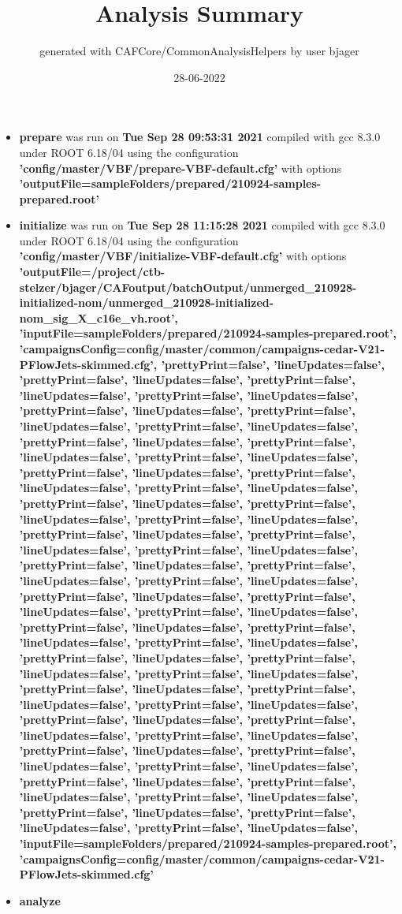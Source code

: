 \documentclass{article}
\title{Analysis Summary}
\author{generated with CAFCore/CommonAnalysisHelpers by user bjager}
\date{28-06-2022}
\begin{document}
\maketitle
\tableofcontents

\begin{itemize}
\item \textbf{prepare} was run on \textbf{Tue Sep 28 09:53:31 2021} compiled with gcc 8.3.0 under ROOT 6.18/04 using the configuration \textbf{'config/master/VBF/prepare-VBF-default.cfg'} with options \textbf{'outputFile=sampleFolders/prepared/210924-samples-prepared.root'} \item \textbf{initialize} was run on \textbf{Tue Sep 28 11:15:28 2021} compiled with gcc 8.3.0 under ROOT 6.18/04 using the configuration \textbf{'config/master/VBF/initialize-VBF-default.cfg'} with options \textbf{'outputFile=/project/ctb-stelzer/bjager/CAFoutput/batchOutput/unmerged\_210928-initialized-nom/unmerged\_210928-initialized-nom\_sig\_X\_c16e\_vh.root', 'inputFile=sampleFolders/prepared/210924-samples-prepared.root', 'campaignsConfig=config/master/common/campaigns-cedar-V21-PFlowJets-skimmed.cfg', 'prettyPrint=false', 'lineUpdates=false', 'prettyPrint=false', 'lineUpdates=false', 'prettyPrint=false', 'lineUpdates=false', 'prettyPrint=false', 'lineUpdates=false', 'prettyPrint=false', 'lineUpdates=false', 'prettyPrint=false', 'lineUpdates=false', 'prettyPrint=false', 'lineUpdates=false', 'prettyPrint=false', 'lineUpdates=false', 'prettyPrint=false', 'lineUpdates=false', 'prettyPrint=false', 'lineUpdates=false', 'prettyPrint=false', 'lineUpdates=false', 'prettyPrint=false', 'lineUpdates=false', 'prettyPrint=false', 'lineUpdates=false', 'prettyPrint=false', 'lineUpdates=false', 'prettyPrint=false', 'lineUpdates=false', 'prettyPrint=false', 'lineUpdates=false', 'prettyPrint=false', 'lineUpdates=false', 'prettyPrint=false', 'lineUpdates=false', 'prettyPrint=false', 'lineUpdates=false', 'prettyPrint=false', 'lineUpdates=false', 'prettyPrint=false', 'lineUpdates=false', 'prettyPrint=false', 'lineUpdates=false', 'prettyPrint=false', 'lineUpdates=false', 'prettyPrint=false', 'lineUpdates=false', 'prettyPrint=false', 'lineUpdates=false', 'prettyPrint=false', 'lineUpdates=false', 'prettyPrint=false', 'lineUpdates=false', 'prettyPrint=false', 'lineUpdates=false', 'prettyPrint=false', 'lineUpdates=false', 'prettyPrint=false', 'lineUpdates=false', 'prettyPrint=false', 'lineUpdates=false', 'prettyPrint=false', 'lineUpdates=false', 'prettyPrint=false', 'lineUpdates=false', 'prettyPrint=false', 'lineUpdates=false', 'prettyPrint=false', 'lineUpdates=false', 'prettyPrint=false', 'lineUpdates=false', 'prettyPrint=false', 'lineUpdates=false', 'prettyPrint=false', 'lineUpdates=false', 'prettyPrint=false', 'lineUpdates=false', 'prettyPrint=false', 'lineUpdates=false', 'prettyPrint=false', 'lineUpdates=false', 'prettyPrint=false', 'lineUpdates=false', 'prettyPrint=false', 'lineUpdates=false', 'prettyPrint=false', 'lineUpdates=false', 'prettyPrint=false', 'lineUpdates=false', 'prettyPrint=false', 'lineUpdates=false', 'inputFile=sampleFolders/prepared/210924-samples-prepared.root', 'campaignsConfig=config/master/common/campaigns-cedar-V21-PFlowJets-skimmed.cfg'} \item \textbf{analyze} 
\end{itemize}
\end{document}
